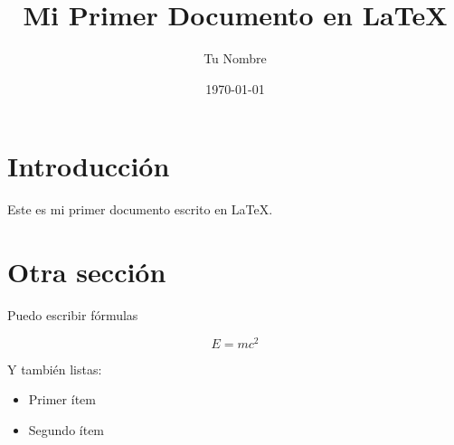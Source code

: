 \documentclass{article} %
\title{Mi Primer Documento en LaTeX}
\author{Tu Nombre}
\date{\today} %
\begin{document}
\maketitle

\section{Introducción}

Este es mi primer documento escrito en \LaTeX. 

\section{Otra sección}

Puedo escribir fórmulas

\[
E = mc^2
\]

Y también listas:
\begin{itemize}
  \item Primer ítem
  \item Segundo ítem
\end{itemize}
\end{document}
